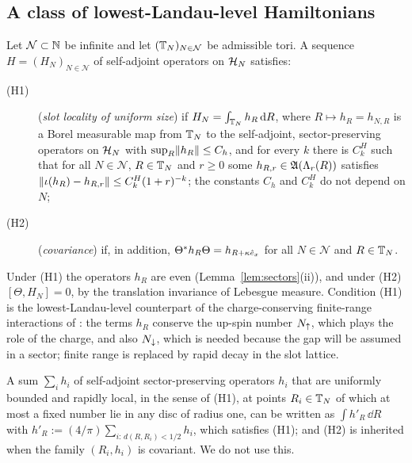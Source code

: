 \subsection{A class of lowest-Landau-level Hamiltonians}

\begin{definition}\label{def:class}
Let $\mathcal N\subset\mathbb{N}$ be infinite and let $(\mathbb{T}_N)_{N\in\mathcal N}$ be admissible tori. A sequence
$H=(H_N)_{N\in\mathcal N}$ of self-adjoint operators on $\mathcal{H}_N$ satisfies:
\begin{description}
\item[(H1)] (\emph{slot locality of uniform size}) if $H_N=\int_{\mathbb{T}_N}h_R\,\mathrm{d} R$, where $R\mapsto h_R=h_{N,R}$ is a
Borel measurable map from $\mathbb{T}_N$ to the self-adjoint, sector-preserving operators on $\mathcal{H}_N$ with
$\sup_R\lVert h_R\rVert\le C_h$, and for every $k$ there is $C^H_k$ such that for all $N\in\mathcal N$, $R\in\mathbb{T}_N$ and
$r\ge0$ some $h_{R,r}\in\mathfrak{A}(\Lambda_{r}(R))$ satisfies $\lVert\iota(h_R)-h_{R,r}\rVert\le C^H_k(1+r)^{-k}$; the constants $C_h$
and $C^H_k$ do not depend on $N$;
\item[(H2)] (\emph{covariance}) if, in addition, $\Theta^*h_R\Theta=h_{R+\kappa\hat{e}_x}$ for all $N\in\mathcal N$ and
$R\in\mathbb{T}_N$.
\end{description}
\end{definition}

Under (H1) the operators $h_R$ are even (Lemma~\ref{lem:sectors}(ii)), and under (H2) $[\Theta,H_N]=0$, by the
translation invariance of Lebesgue measure. Condition (H1) is the lowest-Landau-level counterpart of the
charge-conserving finite-range interactions of \cite[Sections~2.1--2.2]{BBDF21}: the terms $h_R$ conserve the
up-spin number $N_{\uparrow}$, which plays the role of the charge, and also $N_{\downarrow}$, which is needed because the gap
will be assumed in a sector; finite range is replaced by rapid decay in the slot lattice.

\begin{remark}\label{rem:class-discrete}
A sum $\sum_ih_i$ of self-adjoint sector-preserving operators $h_i$ that are uniformly bounded and rapidly
local, in the sense of (H1), at points $R_i\in\mathbb{T}_N$ of which at most a fixed number lie in any disc of
radius one, can be written as $\int h'_R\,\dd R$ with $h'_R:=(4/\pi)\sum_{i:\,d(R,R_i)<1/2}h_i$, which satisfies
(H1); and (H2) is inherited when the family $(R_i,h_i)$ is covariant. We do not use this.
\end{remark}

